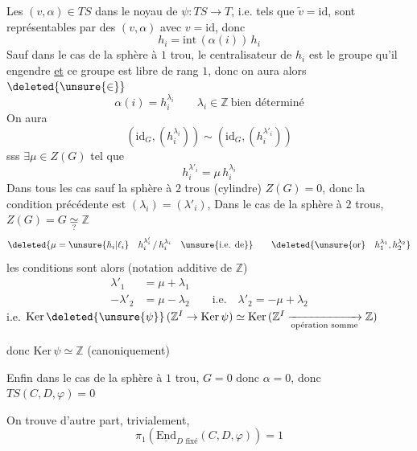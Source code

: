 Les $(v,\alpha)\in TS$ dans le noyau de $\psi:TS\to T$, i.e. tels que $\widetilde v=\mathrm{id}$, sont représentables par des $(v,\alpha)$ avec $v=\mathrm{id}$, donc
\[
h_i=\mathrm{int}\,(\alpha(i))\,h_i
\]
Sauf dans le cas de la sphère à $1$ trou,  le centralisateur de $h_i$ est le groupe qu'il engendre \uline{et} ce groupe est libre de rang $1$, donc on aura alors $\deleted{\unsure{\in}}$
\[
\alpha(i)=h_i^{\lambda_i}\qquad\lambda_i\in\mathbb Z\ \text{bien déterminé}
\]
On aura
\[
(\mathrm{id}_G,(h_i^{\lambda_i}))\sim(\mathrm{id}_G,(h_i^{\lambda'_i}))
\]
sss $\exists\mu\in Z(G)$ tel que
\[
 h_i^{\lambda'_i}=\mu\,h_i^{\lambda_i}
\]
Dans tous les cas sauf la sphère à $2$ trous (cylindre) $Z(G)=0$, donc la condition précédente est $(\lambda_i)=(\lambda'_i)$,  Dans le cas de la sphère à $2$ trous, $Z(G)=G\underset{?}{\simeq}\mathbb Z$  
\[
\deleted{\mu=\unsure{h_i|\ell_i}\quad h_i^{\lambda'_i}\,/\,h_i^{\lambda_i}\quad\unsure{\text{i.e. de}}}
\qquad\deleted{\unsure{\text{or}}\quad h_1^{\lambda_1},h_2^{\lambda_2}}
\]
les conditions sont alors (notation additive de $\mathbb Z$)
\[
\begin{aligned}
\lambda'_1&=\mu+\lambda_1\\
-\lambda'_2&=\mu-\lambda_2\qquad\text{i.e.}\quad\lambda'_2=-\mu+\lambda_2
\end{aligned}
\]
i.e. $\mathrm{Ker}\,\deleted{\unsure{\psi}}\,(\mathbb Z^I\to\mathrm{Ker}\,\psi)\simeq\mathrm{Ker}\,(\mathbb Z^I\xrightarrow[\text{opération somme}]{}\mathbb Z)$

donc \qquad $\mathrm{Ker}\,\psi\simeq\mathbb Z$ \quad (canoniquement)

Enfin dans le cas de la sphère à $1$ trou, $G=0$ donc $\alpha=0$, donc $TS(C,D,\varphi)=0$

On trouve d'autre part, trivialement,
\[
\pi_1(\underline{\mathrm{End}}_{D\text{ fixé}}(C,D,\varphi))=1
\]

